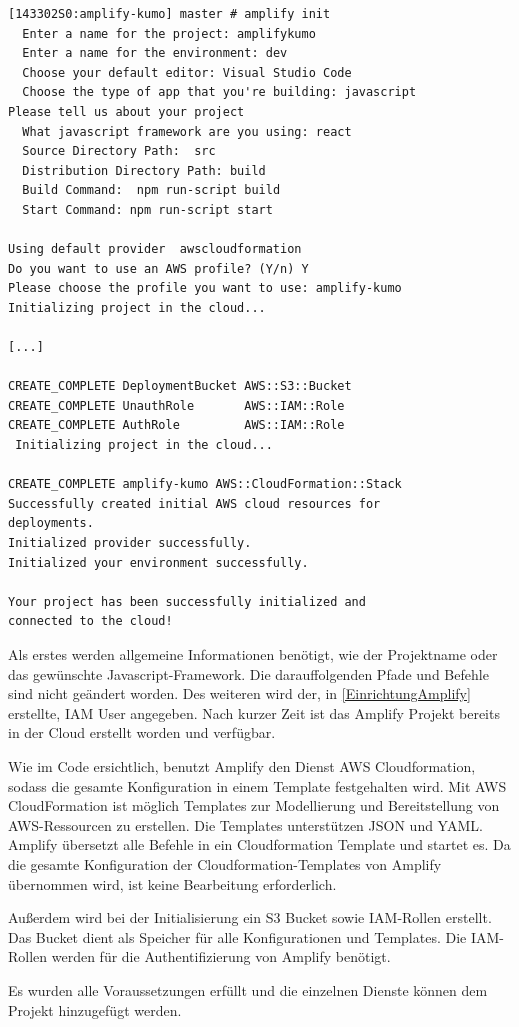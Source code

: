 \begin{lstlisting}[basicstyle=\ttfamily\small, breaklines=true , frame = single, backgroundcolor=\color{lavender} ]
[143302S0:amplify-kumo] master # amplify init
  Enter a name for the project: amplifykumo
  Enter a name for the environment: dev
  Choose your default editor: Visual Studio Code
  Choose the type of app that you're building: javascript
Please tell us about your project
  What javascript framework are you using: react
  Source Directory Path:  src
  Distribution Directory Path: build
  Build Command:  npm run-script build
  Start Command: npm run-script start

Using default provider  awscloudformation
Do you want to use an AWS profile? (Y/n) Y
Please choose the profile you want to use: amplify-kumo
Initializing project in the cloud...

[...]

CREATE_COMPLETE DeploymentBucket AWS::S3::Bucket
CREATE_COMPLETE UnauthRole       AWS::IAM::Role
CREATE_COMPLETE AuthRole         AWS::IAM::Role
 Initializing project in the cloud...

CREATE_COMPLETE amplify-kumo AWS::CloudFormation::Stack
Successfully created initial AWS cloud resources for
deployments.
Initialized provider successfully.
Initialized your environment successfully.

Your project has been successfully initialized and
connected to the cloud!

\end{lstlisting}

Als erstes werden allgemeine Informationen benötigt, wie der Projektname oder das gewünschte Javascript-Framework.
Die darauffolgenden Pfade und Befehle sind nicht geändert worden.
Des weiteren wird der, in \ref{EinrichtungAmplify}  erstellte, IAM User angegeben.
Nach kurzer Zeit ist das Amplify Projekt bereits in der Cloud erstellt worden und verfügbar.

Wie im Code ersichtlich, benutzt Amplify den Dienst AWS Cloudformation, sodass die gesamte Konfiguration in einem Template festgehalten wird.
Mit AWS CloudFormation ist möglich Templates zur Modellierung und Bereitstellung von AWS-Ressourcen zu erstellen.
Die Templates unterstützen JSON und YAML.
Amplify übersetzt alle Befehle in ein Cloudformation Template und startet es.
Da die gesamte Konfiguration der Cloudformation-Templates von Amplify übernommen wird, ist keine Bearbeitung erforderlich.

Außerdem wird bei der Initialisierung ein S3 Bucket sowie IAM-Rollen erstellt.
Das Bucket dient als Speicher für alle Konfigurationen und Templates.
Die IAM-Rollen werden für die Authentifizierung von Amplify benötigt.

Es wurden alle Voraussetzungen erfüllt und die einzelnen Dienste können dem Projekt hinzugefügt werden.
